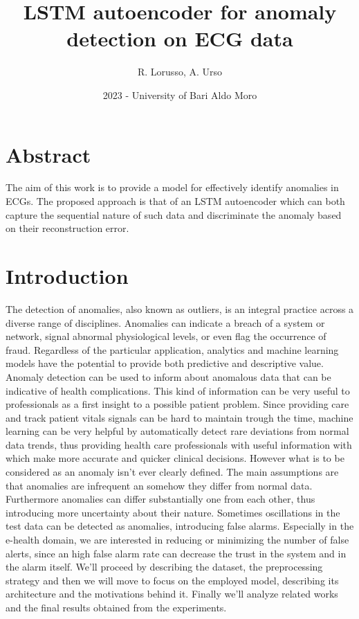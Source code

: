 \documentclass{article}
\begin{document}
\title{LSTM autoencoder for anomaly detection on ECG data}
\author{R. Lorusso, A. Urso}
\date{2023 - University of Bari Aldo Moro}

\maketitle

\begin{multicols*}{2}

\section*{Abstract}
\begin{it}
The aim of this work is to provide a model for effectively identify anomalies in ECGs. The proposed approach is that of an LSTM autoencoder which can both capture the sequential nature of such data and discriminate the anomaly based on their reconstruction error.

\end{it}



\section{Introduction}

The detection of anomalies, also known as outliers, is an integral practice across a diverse range of disciplines. Anomalies can indicate a breach of a system or network, signal abnormal physiological levels, or even flag the occurrence of fraud. Regardless of the particular application, analytics and machine learning models have the potential to provide both predictive and descriptive value. Anomaly detection can be used to inform about anomalous data that can be indicative of health complications. This kind of information can be very useful to professionals as a first insight to a possible patient problem. Since providing care and track patient vitals signals can be hard to maintain trough the time, machine learning can be very helpful by automatically detect rare deviations from normal data trends, thus providing health care professionals with useful information with which make more accurate and quicker clinical decisions. However what is to be considered as an anomaly isn't ever clearly defined. The main assumptions are that anomalies are infrequent an somehow they differ from normal data. Furthermore anomalies can differ substantially one from each other, thus introducing more uncertainty about their nature. Sometimes oscillations in the test data can be detected as anomalies, introducing false alarms. Especially in the e-health domain, we are interested in reducing or minimizing the number of false alerts, since an high false alarm rate can decrease the trust in the system and in the alarm itself.
We'll proceed by describing the dataset, the preprocessing strategy and then we will move to focus on the employed model, describing its architecture and the motivations behind it. Finally we'll analyze related works and the final results obtained from the experiments. 


\end{multicols*}
\end{document}
